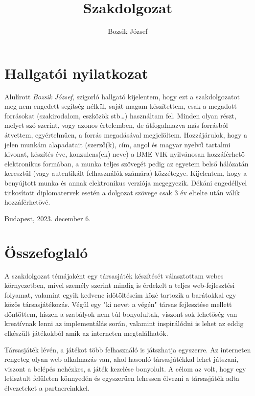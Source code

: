 \documentclass[a4paper,twoside]{article}
\title{Szakdolgozat}
\author{Bozsik József}
\begin{document}
\maketitle
\newpage
\tableofcontents
\newpage
{
\section*{Hallgatói nyilatkozat}}
Alulírott \textit{Bozsik József}, szigorló hallgató kijelentem, hogy ezt a szakdolgozatot meg
nem engedett segítség nélkül, saját magam készítettem, csak a megadott forrásokat (szakirodalom, eszközök stb\ldots) használtam fel. Minden olyan részt, melyet szó szerint, vagy
azonos értelemben, de átfogalmazva más forrásból átvettem, egyértelműen, a forrás megadásával megjelöltem.
Hozzájárulok, hogy a jelen munkám alapadatait (szerző(k), cím, angol és magyar
nyelvű tartalmi kivonat, készítés éve, konzulens(ek) neve) a BME VIK nyilvánosan hozzáférhető elektronikus formában, a munka teljes szövegét pedig az egyetem belső hálózatán
keresztül (vagy autentikált felhasználók számára) közzétegye. Kijelentem, hogy a benyújtott munka és annak elektronikus verziója megegyezik. Dékáni engedéllyel titkosított diplomatervek esetén a dolgozat szövege csak 3 év eltelte után válik hozzáférhetővé.
\begin{flushleft}
	Budapest, 2023. december 6.
\end{flushleft}

\newpage
\section{Összefoglaló}
A szakdolgozat témájaként egy társasjáték készítését választottam webes környezetben, mivel személy szerint mindig is érdekelt a teljes web-fejlesztési folyamat, valamint egyik kedvenc időtöltéseim közé tartozik a barátokkal egy közös társasjátékozás. 
Végül egy "ki nevet a végén" társas fejlesztése mellett döntöttem, hiszen a szabályok nem túl bonyolultak, viszont sok lehetőség van kreatívnak lenni az implementálás során, valamint inspirálódni is lehet az eddig elkészült játékokból amik az interneten megtalálhatók.

Társasjáték lévén, a játékot több felhasználó is játszhatja egyszerre.  Az interneten rengeteg olyan web-alkalmazás van, ahol hasonló társasjátékkal
lehet játszani, viszont a belépés nehézkes, a játék kezelése bonyolult. A célom az volt, hogy
egy letisztult felületen könnyedén és egyszerűen lehessen élvezni a társasjáték adta
élvezeteket a partnereinkkel.
\end{document}
